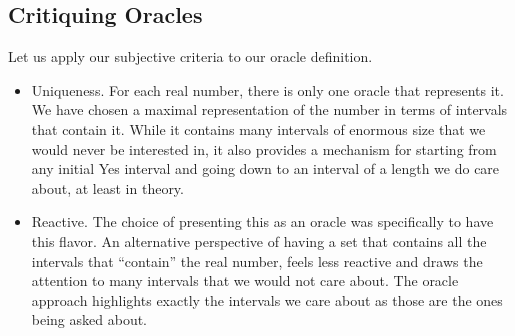 \documentclass[12pt]{article}
\begin{document}
\subsection{Critiquing Oracles}

Let us apply our subjective criteria to our oracle definition. 

\begin{itemize}
    \item Uniqueness. For each real number, there is only one oracle that represents it. We have chosen a maximal representation of the number in terms of intervals that contain it. While it contains many intervals of enormous size that we would never be interested in, it also provides a mechanism for starting from any initial Yes interval and going down to an interval of a length we do care about, at least in theory. 
    \item Reactive. The choice of presenting this as an oracle was specifically to have this flavor. An alternative perspective of having a set that contains all the intervals that ``contain'' the real number, feels less reactive and draws the attention to many intervals that we would not care about. The oracle approach highlights exactly the intervals we care about as those are the ones being asked about. 
    

\end{itemize}
\end{document}
